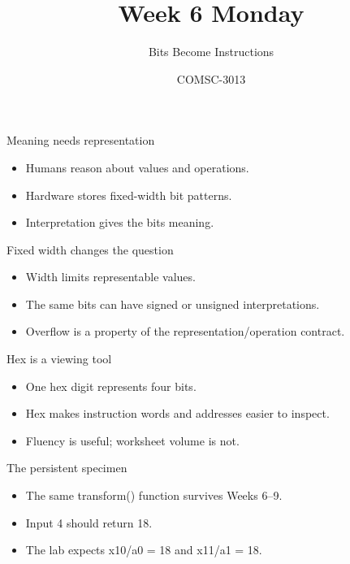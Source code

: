 \documentclass{beamer}
\title{Week 6 Monday}
\subtitle{Bits Become Instructions}
\author{COMSC-3013}
\date{}
\begin{document}
\begin{frame}\titlepage{}\end{frame}
\begin{frame}{Meaning needs representation}\begin{itemize}\item Humans reason about values and operations.\item Hardware stores fixed-width bit patterns.\item Interpretation gives the bits meaning.\end{itemize}\end{frame}
\begin{frame}{Fixed width changes the question}\begin{itemize}\item Width limits representable values.\item The same bits can have signed or unsigned interpretations.\item Overflow is a property of the representation/operation contract.\end{itemize}\end{frame}
\begin{frame}{Hex is a viewing tool}\begin{itemize}\item One hex digit represents four bits.\item Hex makes instruction words and addresses easier to inspect.\item Fluency is useful; worksheet volume is not.\end{itemize}\end{frame}
\begin{frame}{The persistent specimen}\begin{itemize}\item The same transform() function survives Weeks 6--9.\item Input 4 should return 18.\item The lab expects x10/a0 = 18 and x11/a1 = 18.\end{itemize}\end{frame}
\end{document}
